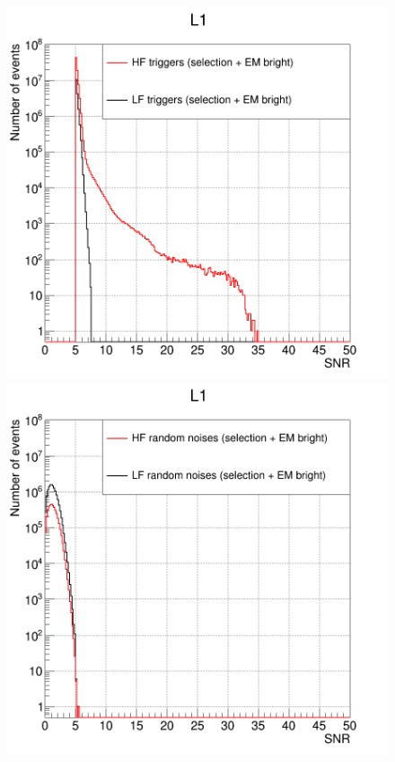 \begin{figure}[ht]
  \centering
  \begin{minipage}{0.45\linewidth}
    \centering
    \includegraphics[width=\linewidth]{sectionFAR/O4/cTrig_good_730000.png}
  \end{minipage}
  \hfill
  \begin{minipage}{0.45\linewidth}
    \centering
    \includegraphics[width=\linewidth]{sectionFAR/O4/cRand_good_730000.png}

\end{minipage}
\end{figure}
